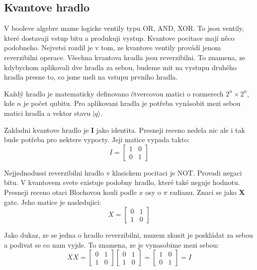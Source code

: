 \documentclass[12pt]{article}
\begin{document}
\subsection{Kvantove hradlo}
V booleve algebre mame logicke ventily typu OR, AND, XOR. To jsou ventily, které dostavaji vstup bitu a produkuji vystup. Kvantove pocitace mají něco podobneho. Nejvetsi rozdil je v tom, ze kvantove ventily provádí jenom reverzibilni operace.
Všechna kvantova hradla jsou reverzibilni. To znamena, ze kdybychom aplikovali dve hradla za sebou, budeme mit na vystupu druhého hradla presne to, co jsme meli na vstupu prvního hradla.
\par Každý hradlo je matematicky definovano čtvercovou matici o rozmerech $2^n \times 2^n$, kde $n$ je počet qubitu. Pro aplikovani hradla je potřeba vynásobit mezi sebou matici hradla a vektor stavu $|q\rangle$.
\par Zakladni kvantove hradlo je \textbf{I} jako identita. Presneji receno nedela nic ale i tak bude potřeba pro nektere vypocty. Jeji matice vypada takto:
$$I = \begin{bmatrix}
        1 & 0 \\
        0 & 1
    \end{bmatrix}$$
\par Nejjednodussi reverzibilni hradlo v klasickem pocitaci je NOT.
Provadi negaci bitu. V kvantovem svete existuje podobny hradlo, které také neguje hodnotu.
Presneji receno otaci  Blochovou kouli podle $x$ osy o $\pi$ radianu. Znaci se jako \textbf{X} gate.
Jeho matice je nasledujici:
$$X = \begin{bmatrix}
        0 & 1 \\
        1 & 0
    \end{bmatrix}$$
\par Jako dukaz, ze se jedna o hradlo reverzibilni, muzem zkusit je poskládat za sebou a podivat se co nam vyjde.
To znamena, ze je vynasobime mezi sebou:
$$XX = \begin{bmatrix}
        0 & 1 \\
        1 & 0
    \end{bmatrix}\begin{bmatrix}
        0 & 1 \\
        1 & 0
    \end{bmatrix} = \begin{bmatrix}
        1 & 0 \\
        0 & 1
    \end{bmatrix} = I$$
\end{document}
